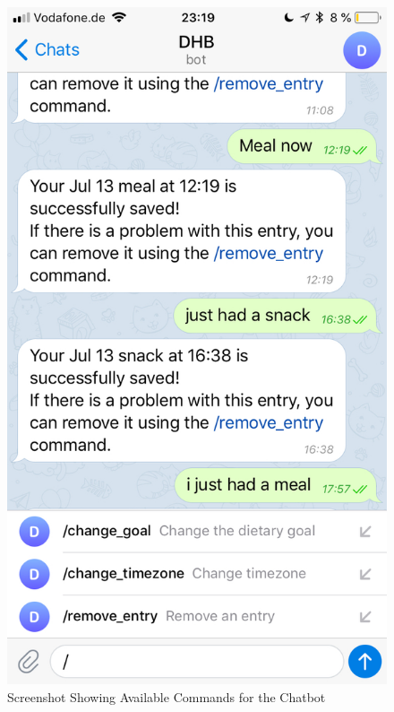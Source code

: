 \begin{figure}[htbp]
\begin{minipage}{.5\textwidth}
	\centering
        \captionsetup{width=\linewidth}
	\includegraphics[scale=0.2]{figures/commands}
        \caption{Screenshot Showing Available Commands for the Chatbot}
	\label{fig:commands}
\end{minipage}%
\begin{minipage}{.5\textwidth}
	\centering
        \captionsetup{width=.9\linewidth}

\end{minipage}
\end{figure}
